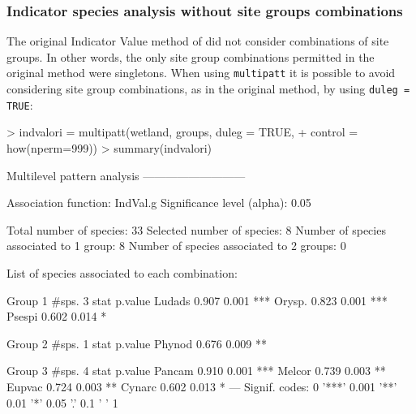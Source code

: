 \documentclass[11pt,a4paper]{article}
\begin{document}
\subsubsection{Indicator species analysis without site groups combinations}
The original Indicator Value method of \citet{Dufrene1997} did not consider combinations of site groups. In other words, the only site group combinations permitted in the original method were singletons. When using \texttt{multipatt} it is possible to avoid considering site group combinations, as in the original method, by using \texttt{duleg = TRUE}:
\begin{Schunk}
\begin{Sinput}
> indvalori = multipatt(wetland, groups, duleg = TRUE, 
+                       control = how(nperm=999)) 
> summary(indvalori)
\end{Sinput}
\begin{Soutput}
 Multilevel pattern analysis
 ---------------------------

 Association function: IndVal.g
 Significance level (alpha): 0.05

 Total number of species: 33
 Selected number of species: 8 
 Number of species associated to 1 group: 8 
 Number of species associated to 2 groups: 0 

 List of species associated to each combination: 

 Group 1  #sps.  3 
        stat p.value    
Ludads 0.907   0.001 ***
Orysp. 0.823   0.001 ***
Psespi 0.602   0.014 *  

 Group 2  #sps.  1 
        stat p.value   
Phynod 0.676   0.009 **

 Group 3  #sps.  4 
        stat p.value    
Pancam 0.910   0.001 ***
Melcor 0.739   0.003 ** 
Eupvac 0.724   0.003 ** 
Cynarc 0.602   0.013 *  
---
Signif. codes:  0 '***' 0.001 '**' 0.01 '*' 0.05 '.' 0.1 ' ' 1 
\end{Soutput}
\end{Schunk}
\end{document}
